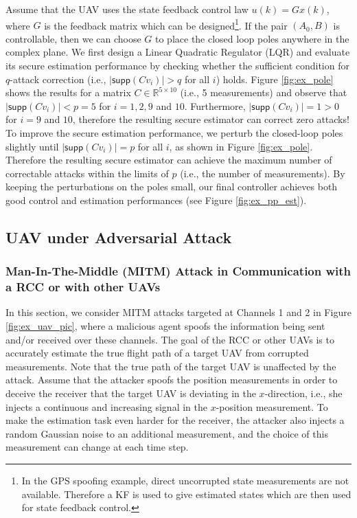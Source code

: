 \documentclass[../../thesis.tex]{subfiles}
\begin{document}
Assume that the UAV uses the state feedback control law $u(k) = G x(k)$, where $G$ is the feedback matrix which can be designed\footnote{In the GPS spoofing example, direct uncorrupted state measurements are not available. Therefore a KF is used to give estimated states which are then used for state feedback control.}. If the pair $(A_0, B)$ is controllable, then we can choose $G$ to place the closed loop poles anywhere in the complex plane. We first design a Linear Quadratic Regulator (LQR) and evaluate its secure estimation performance by checking whether the sufficient condition for $q$-attack correction  (i.e., $\lvert \textsf{supp} (C v_i) \rvert > q$ for all $i$) holds. 
Figure \ref{fig:ex_pole} shows the results for a matrix $C \in \mathbb{R}^{5\times 10}$ (i.e., 5 measurements) and observe that $\lvert \textsf{supp} (C v_i) \rvert < p = 5$ for $i=1,2,9$ and $10$. Furthermore, $\lvert \textsf{supp} (C v_i) \rvert = 1 > 0$ for $i = 9$ and $10$, therefore the resulting secure estimator can correct zero attacks!
To improve the secure estimation performance, we perturb the closed-loop poles slightly until $\lvert \textsf{supp} (C v_i) \rvert = p$ for all $i$, as shown in Figure \ref{fig:ex_pole}. Therefore the resulting secure estimator can achieve the maximum number of correctable attacks within the limits of $p$ (i.e., the number of measurements). By keeping the perturbations on the poles small, our final controller achieves both good control and estimation performances (see Figure \ref{fig:ex_pp_est}).%




\subsection{UAV under Adversarial Attack}

\subsubsection{Man-In-The-Middle (MITM) Attack in Communication with a RCC or with other UAVs} \label{sec:uav_utm}

In this section, we consider MITM attacks targeted at Channels 1 and 2 in Figure \ref{fig:ex_uav_pic}, where a malicious agent spoofs the information being sent and/or received over these channels. The goal of the RCC or other UAVs is to accurately estimate the true flight path of a target UAV from corrupted measurements. 
Note that the true path of the target UAV is unaffected by the attack.
Assume that the attacker spoofs the position measurements in order to deceive the receiver that the target UAV is deviating in the $x$-direction, i.e., she injects a continuous and increasing signal in the $x$-position measurement.
To make the estimation task even harder for the receiver, the attacker also injects a random Gaussian noise to an additional measurement, and the choice of this measurement can change at each time step. 
\end{document}

